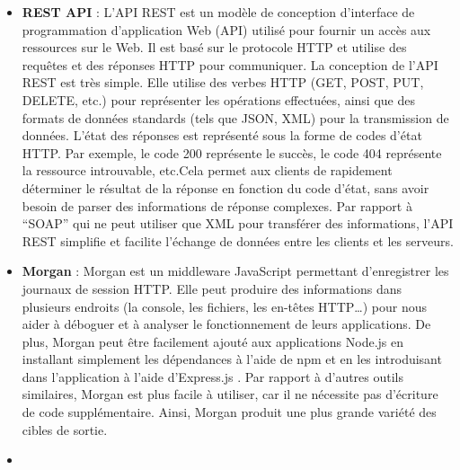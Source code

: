 \documentclass[12pt]{article}
\begin{document}
      \begin{itemize}
            \item
                  \textbf{REST API} \cite{PC3R} : L'API REST
                  est un modèle de conception d'interface de programmation d'application
                  Web (API) utilisé pour fournir un accès aux ressources sur le Web. Il
                  est basé sur le protocole HTTP et utilise des requêtes et des réponses
                  HTTP pour communiquer. \newline  La conception de l'API REST est très
                  simple. Elle utilise des verbes HTTP (GET, POST, PUT, DELETE, etc.)
                  pour représenter les opérations effectuées, ainsi que des formats de
                  données standards (tels que JSON, XML) pour la transmission de
                  données. L'état des réponses est représenté sous la forme de codes
                  d'état HTTP. Par exemple, le code 200 représente le succès, le code
                  404 représente la ressource introuvable, etc.\newline  Cela permet aux
                  clients de rapidement déterminer le résultat de la réponse en fonction
                  du code d'état, sans avoir besoin de parser des informations de
                  réponse complexes. Par rapport à ``SOAP'' qui ne peut utiliser que XML
                  pour transférer des informations, l'API REST simplifie et facilite
                  l'échange de données entre les clients et les serveurs.
            \item
                  \textbf{Morgan} \cite{morgan} : Morgan est
                  un middleware JavaScript permettant d'enregistrer les journaux de
                  session HTTP. Elle peut produire des informations dans plusieurs
                  endroits (la console, les fichiers, les en-têtes HTTP\ldots) pour nous
                  aider à déboguer et à analyser le fonctionnement de leurs
                  applications. De plus, Morgan peut être facilement ajouté aux
                  applications Node.js en installant simplement les dépendances à l'aide
                  de npm et en les introduisant dans l'application à l'aide d'Express.js
                  \cite{Express_js}. Par rapport à d'autres
                  outils similaires, Morgan est plus facile à utiliser, car il ne
                  nécessite pas d'écriture de code supplémentaire. Ainsi, Morgan produit
                  une plus grande variété des cibles de sortie.
            \item

\end{itemize}
\end{document}
